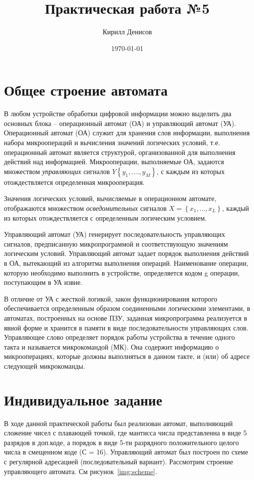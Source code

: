 \documentclass[a4paper,14pt]{extarticle}
\author{Кирилл Денисов}
\title{Практическая работа №5}
\date{\today}
\newcommand{\pathToCommonFolder}{/home/denilai/Desktop/LaTeX/Common}
\begin{document}
	\thispagestyle{empty}
	
	
	
	\newpage
	\tableofcontents
	\newpage
	
\section{Общее строение автомата}
В любом устройстве обработки цифровой информации можно выделить два основных блока – операционный автомат (ОА) и управляющий автомат (УА). Операционный автомат (ОА) служит для хранения слов информации, выполнения набора микроопераций и вычисления значений логических условий, т.е. операционный автомат является структурой, организованной для выполнения действий над информацией. Микрооперации, выполняемые ОА, задаются множеством \textit{управляющих} сигналов $Y\left\{y_1,....,y_M\right\}$, с каждым из которых отождествляется определенная микрооперация.

Значения логических условий, вычисляемые в операционном автомате, отображаются множеством \textit{осведомительных} сигналов $X=\left\{x_1,...,x_L\right\}$, каждый из которых отождествляется с определенным логическим условием.

Управляющий автомат (УА) генерирует последовательность управляющих сигналов, предписанную микропрограммой и соответствующую значениям логическим условий. Управляющий автомат задает порядок выполнения действий в ОА, вытекающий из алгоритма выполнения операций. Наименование операции, которую необходимо выполнить в устройстве, определяется кодом g операции, поступающим в УА извне. 

В отличие от УА с жесткой логикой, закон функционирования которого обеспечивается определенным образом соединенными логическими элементами, в автоматах, построенных на основе ПЗУ, заданная микропрограмма реализуется в явной форме и хранится в памяти в виде последовательности управляющих слов. Управляющее слово определяет порядок работы устройства в течение одного такта и называется микрокомандой (МК). Она содержит информацию о микрооперациях, которые должны выполняться в данном такте, и (или) об адресе следующей микрокоманды.
\section{Индивидуальное задание}
В ходе данной практической работы был реализован автомат, выполняющий сложение чисел с плавающей точкой, где мантисса числа представленна в виде 5 разрядов в доп.коде, а порядок в виде 5-ти разрядного положительного целого числа в смещенном коде (С = 16). Управляющий автомат был построен по схеме с регулярной адресацией (последовательный вариант). Рассмотрим строение управляющего автомата. См рисунок~\ref{img:scheme}.
\end{document}
